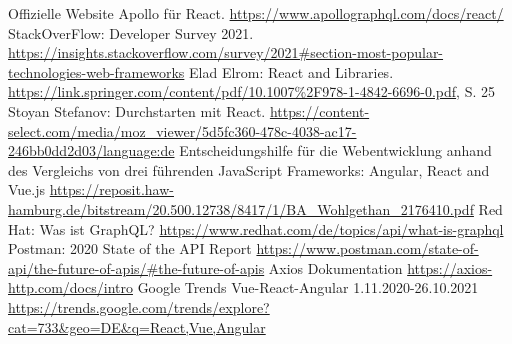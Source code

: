\begin{thebibliography}{HR08}
         Offizielle Website Apollo für React. \url{https://www.apollographql.com/docs/react/}
         StackOverFlow: Developer Survey 2021. \url{https://insights.stackoverflow.com/survey/2021#section-most-popular-technologies-web-frameworks}
         Elad Elrom: React and Libraries. \url{https://link.springer.com/content/pdf/10.1007%2F978-1-4842-6696-0.pdf}, S. 25
         Stoyan Stefanov: Durchstarten mit React. \url{https://content-select.com/media/moz_viewer/5d5fc360-478c-4038-ac17-246bb0dd2d03/language:de}
         Entscheidungshilfe für die Webentwicklung anhand des Vergleichs von drei führenden JavaScript Frameworks: Angular, React and Vue.js \url{https://reposit.haw-hamburg.de/bitstream/20.500.12738/8417/1/BA_Wohlgethan_2176410.pdf}
         Red Hat: Was ist GraphQL? \url{https://www.redhat.com/de/topics/api/what-is-graphql}
         Postman: 2020 State of the API Report \url{https://www.postman.com/state-of-api/the-future-of-apis/#the-future-of-apis}
         Axios Dokumentation \url{https://axios-http.com/docs/intro}
         Google Trends Vue-React-Angular 1.11.2020-26.10.2021 \url{https://trends.google.com/trends/explore?cat=733&geo=DE&q=React,Vue,Angular}



\end{thebibliography}
